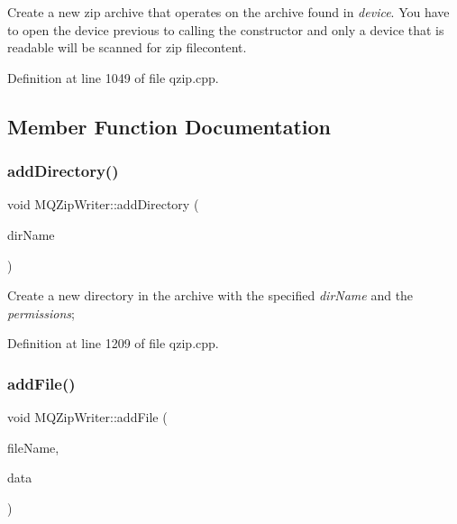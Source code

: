 Create a new zip archive that operates on the archive found in {\itshape device}. You have to open the device previous to calling the constructor and only a device that is readable will be scanned for zip filecontent. 

Definition at line 1049 of file qzip.\+cpp.



\subsection{Member Function Documentation}
\mbox{\label{class_m_q_zip_writer_a08703913c70762b5a649bad3be9e1c6c}} 
\subsubsection{\texorpdfstring{add\+Directory()}{addDirectory()}}
{\footnotesize\ttfamily void M\+Q\+Zip\+Writer\+::add\+Directory (\begin{DoxyParamCaption}\item[{const Q\+String \&}]{dir\+Name }\end{DoxyParamCaption})}

Create a new directory in the archive with the specified {\itshape dir\+Name} and the {\itshape permissions}; 

Definition at line 1209 of file qzip.\+cpp.

\mbox{\label{class_m_q_zip_writer_af6d89acc4efc589f0c90c985106e2b00}} 
\subsubsection{\texorpdfstring{add\+File()}{addFile()}\hspace{0.1cm}{\footnotesize\ttfamily [1/2]}}
{\footnotesize\ttfamily void M\+Q\+Zip\+Writer\+::add\+File (\begin{DoxyParamCaption}\item[{const Q\+String \&}]{file\+Name,  }\item[{const Q\+Byte\+Array \&}]{data }\end{DoxyParamCaption})}

